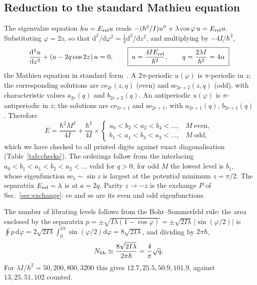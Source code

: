 \documentclass[preprint,12pt]{elsarticle}
\newcommand{\dd}{\mathrm{d}}
\newcommand{\Erel}{E_{\rm rel}}
\begin{document}
\subsection{Reduction to the standard Mathieu equation}

The eigenvalue equation $h u=\Erel u$ reads
$-(\hbar^{2}/I)u''+\lambda\cos\varphi\,u=\Erel u$. Substituting $\varphi=2z$,
so that $\dd^{2}/\dd\varphi^{2}=\tfrac14\dd^{2}/\dd z^{2}$, and multiplying by
$-4I/\hbar^{2}$,
\begin{equation}
\frac{\dd^{2}u}{\dd z^{2}}+\left(a-2q\cos2z\right)u=0,\qquad
\boxed{\;a=\frac{4I\Erel}{\hbar^{2}},\qquad q=\frac{2\lambda I}{\hbar^{2}}
=4\alpha\;}
\label{eq:mathieu}
\end{equation}
the Mathieu equation in standard form~\cite{DLMF28,AbramowitzStegun}. A
$2\pi$-periodic $u(\varphi)$ is $\pi$-periodic in $z$; the corresponding
solutions are $\mathrm{ce}_{2r}(z,q)$ (even) and $\mathrm{se}_{2r+2}(z,q)$
(odd), with characteristic values $a_{2r}(q)$ and $b_{2r+2}(q)$. An
antiperiodic $u(\varphi)$ is $\pi$-antiperiodic in $z$; the solutions are
$\mathrm{ce}_{2r+1}$ and $\mathrm{se}_{2r+1}$, with $a_{2r+1}(q)$, $b_{2r+1}(q)$.
Therefore
\begin{equation}
E=\frac{\hbar^{2}M^{2}}{4I}+\frac{\hbar^{2}}{4I}\times
\begin{cases}a_{0}<b_{2}<a_{2}<b_{4}<\dots, & M\ \text{even},\\[2pt]
b_{1}<a_{1}<b_{3}<a_{3}<\dots, & M\ \text{odd},\end{cases}
\label{eq:Emathieu}
\end{equation}
which we have checked to all printed digits against exact diagonalisation
(Table~\ref{tab:checks}). The orderings follow from the interlacing
$a_{0}<b_{1}<a_{1}<b_{2}<a_{2}<\dots$ valid for $q>0$; for odd $M$ the lowest
level is $b_{1}$, whose eigenfunction $\mathrm{se}_{1}\sim\sin z$ is largest at the
potential minimum $z=\pi/2$. The separatrix $\Erel=\lambda$ is at $a=2q$. Parity
$z\to-z$ is the exchange $P$ of Sec.~\ref{sec:exchange}: $\mathrm{ce}$ and
$\mathrm{se}$ are its even and odd eigenfunctions.

The number of librating levels follows from the Bohr--Sommerfeld rule: the
area enclosed by the separatrix
$p=\pm\sqrt{I\lambda(1-\cos\varphi)}=\pm\sqrt{2I\lambda}\,|\sin(\varphi/2)|$ is
$\oint p\,\dd\varphi=2\sqrt{2I\lambda}\int_{0}^{2\pi}\sin(\varphi/2)\dd\varphi
=8\sqrt{2I\lambda}$, and dividing by $2\pi\hbar$,
\begin{equation}
N_{\rm lib}\simeq\frac{8\sqrt{2I\lambda}}{2\pi\hbar}=\frac{4}{\pi}\sqrt{q}.
\end{equation}
For $\lambda I/\hbar^{2}=50,200,800,3200$ this gives $12.7,25.5,50.9,101.9$,
against $13,25,51,102$ counted.
\end{document}
